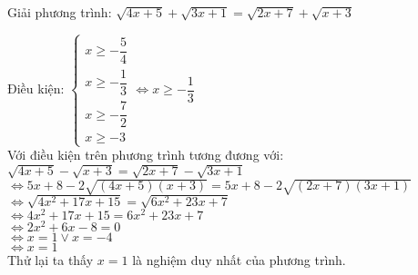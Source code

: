 \begin{baitap}
 Giải phương trình: $\sqrt{4x +5 } + \sqrt{3x +1 } = \sqrt{2x +7 } + \sqrt{x+3 } $
\begin{loigiai1}
    Điều kiện: $ \begin{cases}
        x \geq -\dfrac{5 }{4 } \\
        x \geq - \dfrac{1 }{3 } \\
        x \geq - \dfrac{7}{2}  \\
        x \geq -3
    \end{cases} \Leftrightarrow x \geq -\dfrac{1 }{3 } $ \\
    Với điều kiện trên phương trình tương đương với: \\
    $\sqrt{4x +5 } -   \sqrt{x+3 }  =  \sqrt{2x +7 }- \sqrt{3x +1 }$ \\
$ \Leftrightarrow 5x +8 -2 \sqrt{(4x+5 )(x+3 ) } = 5x +8 -2 \sqrt{(2x+7)(3x+1) } $ \\
$ \Leftrightarrow \sqrt{4x^2 + 17x + 15 } = \sqrt{6x^2 + 23x + 7}  $ \\
$ \Leftrightarrow 4x^2 + 17x + 15 = 6x^2 +23 x +7 $ \\
$ \Leftrightarrow 2x^2 +6x -8 =0 $ \\
$ \Leftrightarrow x=1 \vee x= -4 $ \\
$ \Leftrightarrow x=1 $ \\
Thử lại ta thấy $ x=1 $ là nghiệm duy nhất của phương trình.
\end{loigiai1}

\end{baitap}
